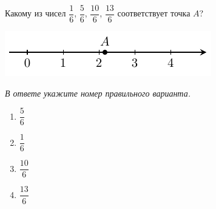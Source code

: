 Какому из чисел $\dfrac{1}{6}$, $\dfrac{5}{6}$, $\dfrac{10}{6}$, $\dfrac{13}{6}$ соответствует точка $A$?
\begin{center}
	\includegraphics[align=t]{graphs/graph_3/graph_3}
\end{center}

\textit{В ответе укажите номер правильного варианта.}
\begin{multicols}{4}
	\begin{enumerate}[label=\arabic*)]
		\item $\dfrac{5}{6}$
		\item $\dfrac{1}{6}$
		\item $\dfrac{10}{6}$
		\item $\dfrac{13}{6}$
	\end{enumerate}
\end{multicols}